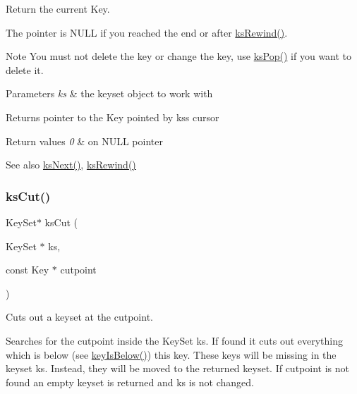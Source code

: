 Return the current Key. 

The pointer is N\+U\+LL if you reached the end or after \hyperlink{group__keyset_gabe793ff51f1728e3429c84a8a9086b70}{ks\+Rewind()}.

\begin{DoxyNote}{Note}
You must not delete the key or change the key, use \hyperlink{group__keyset_gae42530b04defb772059de0600159cf69}{ks\+Pop()} if you want to delete it.
\end{DoxyNote}

\begin{DoxyParams}{Parameters}
{\em ks} & the keyset object to work with \\
\hline
\end{DoxyParams}
\begin{DoxyReturn}{Returns}
pointer to the Key pointed by {\ttfamily ks\textquotesingle{}s} cursor 
\end{DoxyReturn}

\begin{DoxyRetVals}{Return values}
{\em 0} & on N\+U\+LL pointer \\
\hline
\end{DoxyRetVals}
\begin{DoxySeeAlso}{See also}
\hyperlink{group__keyset_ga317321c9065b5a4b3e33fe1c399bcec9}{ks\+Next()}, \hyperlink{group__keyset_gabe793ff51f1728e3429c84a8a9086b70}{ks\+Rewind()} 
\end{DoxySeeAlso}
\mbox{\label{group__keyset_ga6b00cf82b59af4d883a9bad6cf4a4a4a}} 
\subsubsection{\texorpdfstring{ks\+Cut()}{ksCut()}}
{\footnotesize\ttfamily Key\+Set$\ast$ ks\+Cut (\begin{DoxyParamCaption}\item[{Key\+Set $\ast$}]{ks,  }\item[{const Key $\ast$}]{cutpoint }\end{DoxyParamCaption})}



Cuts out a keyset at the cutpoint. 

Searches for the cutpoint inside the Key\+Set ks. If found it cuts out everything which is below (see \hyperlink{group__keytest_ga03332b5d97c76a4fd2640aca4762b8df}{key\+Is\+Below()}) this key. These keys will be missing in the keyset {\ttfamily ks}. Instead, they will be moved to the returned keyset. If {\ttfamily cutpoint} is not found an empty keyset is returned and {\ttfamily ks} is not changed.

